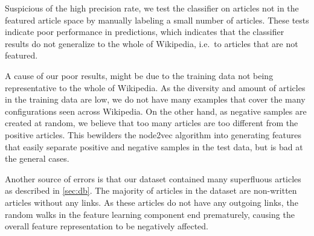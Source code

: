 Suspicious of the high precision rate, we test the classifier on articles not in the featured article space by manually labeling a small number of articles. These tests indicate poor performance in predictions, which indicates that the classifier results do not generalize to the whole of Wikipedia, i.e.\ to articles that are not featured.



A cause of our poor results, might be due to the training data not being representative to the whole of Wikipedia. As the diversity and amount of articles in the training data are low, we do not have many examples that cover the many configurations seen across Wikipedia. On the other hand, as negative samples are created at random, we believe that too many articles are too different from the positive articles. This bewilders the node2vec algorithm into generating features that easily separate positive and negative samples in the test data, but is bad at the general cases.

Another source of errors is that our dataset contained many superfluous articles as described in \cref{sec:db}. The majority of articles in the dataset are non-written articles without any links. As these articles do not have any outgoing links, the random walks in the feature learning component end prematurely, causing the overall feature representation to be negatively affected.



